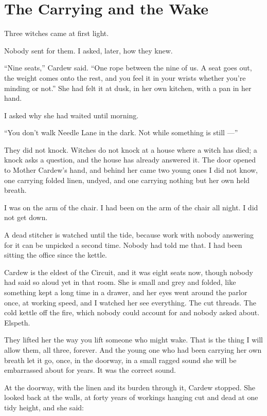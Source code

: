 \chapter{The Carrying and the Wake}

Three witches came at first light.

Nobody sent for them. I asked, later, how they knew.

``Nine seats,'' Cardew said. ``One rope between the nine of us. A seat goes out, the weight comes onto the rest, and you feel it in your wrists whether you're minding or not.'' She had felt it at dusk, in her own kitchen, with a pan in her hand.

I asked why she had waited until morning.

``You don't walk Needle Lane in the dark. Not while something is still ---''

They did not knock. Witches do not knock at a house where a witch has died; a knock asks a question, and the house has already answered it. The door opened to Mother Cardew's hand, and behind her came two young ones I did not know, one carrying folded linen, undyed, and one carrying nothing but her own held breath.

I was on the arm of the chair. I had been on the arm of the chair all night. I did not get down.

A dead stitcher is watched until the tide, because work with nobody answering for it can be unpicked a second time. Nobody had told me that. I had been sitting the office since the kettle.

Cardew is the eldest of the Circuit, and it was eight seats now, though nobody had said so aloud yet in that room. She is small and grey and folded, like something kept a long time in a drawer, and her eyes went around the parlor once, at working speed, and I watched her see everything. The cut threads. The cold kettle off the fire, which nobody could account for and nobody asked about. Elspeth.

They lifted her the way you lift someone who might wake. That is the thing I will allow them, all three, forever. And the young one who had been carrying her own breath let it go, once, in the doorway, in a small ragged sound she will be embarrassed about for years. It was the correct sound.

At the doorway, with the linen and its burden through it, Cardew stopped. She looked back at the walls, at forty years of workings hanging cut and dead at one tidy height, and she said:

